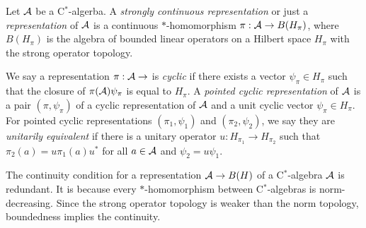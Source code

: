 \documentclass[a4paper]{article}
\begin{document}
\begin{defn}
Let $\mathcal{A}$ be a C$^*$-algerba.
A \emph{strongly continuous representation} or just a \emph{representation} of $\mathcal{A}$ is a continuous $*$-homomorphism $\pi:\mathcal{A}\to B(H_\pi)$, where $B(H_\pi)$ is the algebra of bounded linear operators on a Hilbert space $H_\pi$ with the strong operator topology.

We say a representation $\pi:\mathcal{A}\to$ is \emph{cyclic} if there exists a vector $\psi_\pi\in H_\pi$ such that the closure of $\pi(\mathcal{A})\psi_\pi$ is equal to $H_\pi$.
A \emph{pointed cyclic representation} of $\mathcal{A}$ is a pair $(\pi,\psi_\pi)$ of a cyclic representation of $\mathcal{A}$ and a unit cyclic vector $\psi_\pi\in H_\pi$.
For pointed cyclic representations $(\pi_1,\psi_1)$ and $(\pi_2,\psi_2)$, we say they are \emph{unitarily equivalent} if there is a unitary operator $u:H_{\pi_1}\to H_{\pi_2}$ such that $\pi_2(a)=u\pi_1(a)u^*$ for all $a\in\mathcal{A}$ and $\psi_2=u\psi_1$.
\end{defn}

\begin{rmk}
The continuity condition for a representation $\mathcal{A}\to B(H)$ of a C$^*$-algebra $\mathcal{A}$ is redundant.
It is because every $*$-homomorphism between C$^*$-algebras is norm-decreasing.
Since the strong operator topology is weaker than the norm topology, boundedness implies the continuity.
\end{rmk}
\end{document}
